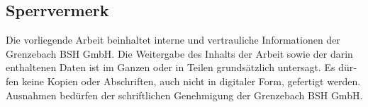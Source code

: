 
\clearpage
\begin{otherlanguage}{ngerman}
    \thispagestyle{empty}
    \section*{Sperrvermerk}

    Die vorliegende Arbeit beinhaltet interne und vertrauliche Informationen der
    Grenzebach BSH GmbH. Die Weitergabe des Inhalts der Arbeit sowie der darin
    enthaltenen Daten ist im Ganzen oder in Teilen grundsätzlich untersagt.
    Es dürfen keine Kopien oder Abschriften, auch nicht in digitaler Form,
    gefertigt werden. Ausnahmen bedürfen der schriftlichen Genehmigung der
    Grenzebach BSH GmbH.

    \vspace{4\baselineskip}
\end{otherlanguage}
